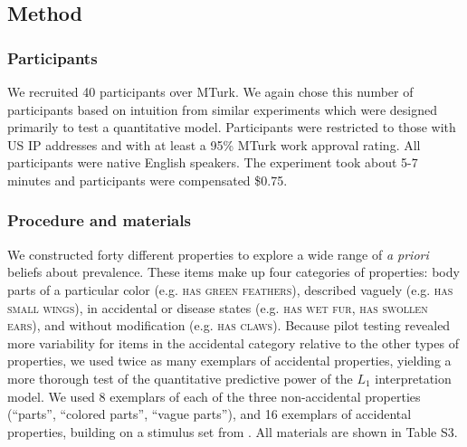 \documentclass[12pt,letterpaper]{article}
\begin{document}
%
%
%


\subsection*{Method}

\subsubsection*{Participants}

We recruited 40 participants over MTurk.  
We again chose this number of participants based on intuition from similar experiments which were designed primarily to test a quantitative model.
Participants were restricted to those with US IP addresses and with at least a 95\% MTurk work approval rating. 
All participants were native English speakers. 
The experiment took about 5-7 minutes and participants were compensated \$0.75.

\subsubsection*{Procedure and materials}

We constructed forty different properties to explore a wide range of \emph{a priori} beliefs about prevalence. 
These items make up four categories of properties: body parts of a particular color (e.g. \textsc{has green feathers}), described vaguely (e.g. \textsc{has small wings}), in accidental or disease states (e.g. \textsc{has wet fur}, \textsc{has swollen ears}), and without modification (e.g. \textsc{has claws}).
Because pilot testing revealed more variability for items in the accidental category relative to the other types of properties, we used twice as many exemplars of accidental properties, yielding a more thorough test of the quantitative predictive power of the $L_1$ interpretation model. 
We used 8 exemplars of each of the three non-accidental properties (``parts'', ``colored parts'', ``vague parts''), and 16 exemplars of accidental properties, building on a stimulus set from .
All materials are shown in Table S3.
\end{document}

